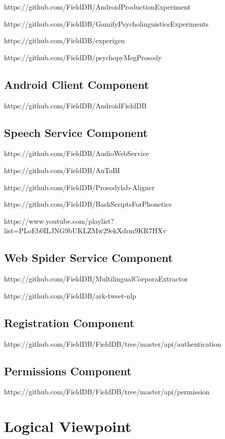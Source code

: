 \documentclass[12pt]{article}
\begin{document}
https://github.com/FieldDB/AndroidProductionExperiment

https://github.com/FieldDB/GamifyPsycholinguisticsExperiments

https://github.com/FieldDB/experigen


https://github.com/FieldDB/psychopyMegProsody


\subsection{Android Client Component}

https://github.com/FieldDB/AndroidFieldDB


\subsection{Speech Service Component}

https://github.com/FieldDB/AudioWebService

https://github.com/FieldDB/AuToBI

https://github.com/FieldDB/Prosodylab-Aligner

https://github.com/FieldDB/BashScriptsForPhonetics


https://www.youtube.com/playlist?list=PLoEb0ILJNG9bUKLZMw29ekXdrm9KR7HXv

\subsection{Web Spider Service Component}

https://github.com/FieldDB/MultilingualCorporaExtractor


https://github.com/FieldDB/ark-tweet-nlp


\subsection{Registration Component}

https://github.com/FieldDB/FieldDB/tree/master/api/authentication


\subsection{Permissions Component}

https://github.com/FieldDB/FieldDB/tree/master/api/permission

\section{Logical Viewpoint}
\end{document}
